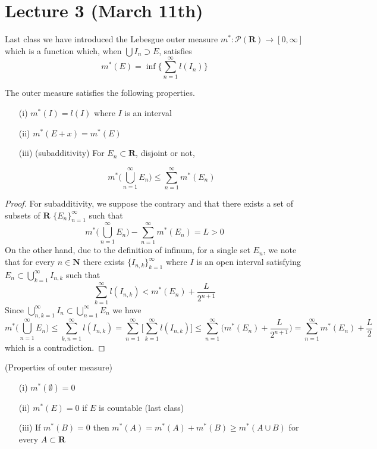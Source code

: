 \section{Lecture 3 (March 11th)}
\begin{recall}
	Last class we have introduced the Lebesgue outer measure $m^{*}:\mathcal{P}({\bm R})\rightarrow [0,\infty ]$  which is a function which, when $\bigcup I_{n}\supset  E$, satisfies
\[m^{*}(E)=\inf \Big\{\sum ^{\infty }_{n=1}l(I_{n})\Big\}\] \end{recall}
\vspace{2ex}
\begin{rmk}
The outer measure satisfies the following properties.
\begin{itemize}
	\item[(i)] $m^{*}(I)=l(I)$ where $I$ is an interval
	\item[(ii)] $m^{*}(E+x)=m^{*}(E)$
	\item[(iii)] (subadditivity) For $E_{n}\subset {\bm R}$, disjoint or not,

		\[m^{*}\Big(\bigcup^{\infty }_{n=1}E_{n}\Big)\leq\sum ^{\infty }_{n=1}m^{*}(E_{n})\]
\end{itemize}
\end{rmk}
\vspace{2ex}
\begin{proof}
For subadditivity, we suppose the contrary and that there exists a set of subsets of ${\bm R}$ $\{E_{n}\}_{n=1}^{\infty }$ such that 
\[m^{*}\Big(\bigcup_{n=1}^{\infty }E_{n}\Big)-\sum ^{\infty }_{n=1}m^{*}(E_{n})=L>0\]
On the other hand, due to the definition of infinum, for a single set $E_{n}$, we note that for every $n\in {\bm N}$ there exists $\{I_{n,k}\}_{k=1}^{\infty }$ where $I$ is an open interval satisfying $E_{n}\subset \bigcup^{\infty }_{k=1}I_{n,k}$ such that
\[\sum ^{\infty }_{k=1}l(I_{n,k})<m^{*}(E_{n})+\dfrac{L}{2^{n+1}}\]
Since $\bigcup^{\infty }_{n,k=1}I_{n}\subset \bigcup^{\infty }_{n=1}E_{n}$ we have
\[m^{*}\Big(\bigcup^{\infty }_{n=1}E_{n}\Big)\leq \sum ^{\infty }_{k,n=1}l(I_{n,k})=\sum ^{\infty }_{n=1}\Big[\sum ^{\infty }_{k=1}l(I_{n,k})\Big]\leq \sum _{n=1}^{\infty }\Big(m^{*}(E_{n})+\dfrac{L}{2^{n+1}}\Big)=\sum ^{\infty }_{n=1}m^{*}(E_{n})+\dfrac{L}{2}\]
which is a contradiction.
\end{proof}
\vspace{2ex}
\begin{rmk}
(Properties of outer measure) 
\begin{itemize}
	\item[(i)] $m^{*}(\emptyset)=0$
	\item[(ii)] $m^{*}(E)=0$ if $E$ is countable (last class)
	\item[(iii)] If $m^{*}(B)=0$ then $m^{*}(A)=m^{*}(A)+m^{*}(B)\geq m^{*}(A\cup B)$ for every $A\subset {\bm R}$
\end{itemize}
\end{rmk}
